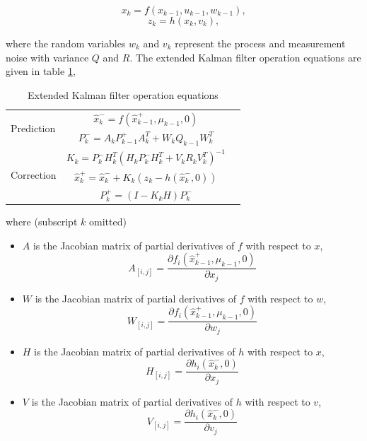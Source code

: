 \begin{equation}
x_k=f(x_{k-1}, u_{k-1}, w_{k-1}),
\end{equation}
\begin{equation}
z_k=h(x_k, v_k),
\end{equation}

\noindent where the random variables $w_k$ and $v_k$ represent the
process and measurement noise with variance $Q$ and $R$. The extended
Kalman filter operation equations are given in table \ref{tab:EKF},

\begin{table}[H]
\caption{Extended Kalman filter operation equations}
\label{tab:EKF}
\centering
\begin{tabular}{|l|c r|}
\hline
\multirow{2}{*}{Prediction} 
& $\hat{x}^-_k=f(\hat{x}^+_{k-1},\mu_{k-1},0)$ & \stepcounter{equation}\thetag{\theequation}\\
& $P^-_k = A_kP^+_{k-1}A_k^T+W_kQ_{k-1}W_k^T$ & \stepcounter{equation}\thetag{\theequation}\\
\hline
\multirow{3}{*}{Correction}
& $K_k=P^-_kH_k^T(H_kP^-_kH_k^T+V_kR_kV_k^T)^{-1}$  & \stepcounter{equation}\thetag{\theequation}\\
& $\hat{x}^+_k = \hat{x}^-_k+K_k(z_k-h(\hat{x}^-_k,0))$ & \stepcounter{equation}\thetag{\theequation}\\
& $P^+_k = (I-K_kH)P^-_k$ & \stepcounter{equation}\thetag{\theequation}\\
\hline
\end{tabular}
\end{table}
\FloatBarrier

\noindent where (subscript $k$ omitted)
\begin{itemize}
  \item $A$ is the Jacobian matrix of partial derivatives of $f$ with
  respect to $x$, $$A_{[i,j]}= \frac{\partial f_i(\hat{x}_{k-1}^+,
    \mu_{k-1}, 0)}{\partial x_j}$$
  \item $W$ is the Jacobian matrix of partial derivatives of $f$ with
  respect to $w$, $$W_{[i,j]}= \frac{\partial f_i(\hat{x}_{k-1}^+,
    \mu_{k-1}, 0)}{\partial w_j}$$
  \item $H$ is the Jacobian matrix of partial derivatives of $h$ with
  respect to $x$, $$H_{[i,j]}= \frac{\partial h_i(\hat{x}_k^-,
    0)}{\partial x_j}$$
  \item $V$ is the Jacobian matrix of partial derivatives of $h$ with
  respect to $v$, $$V_{[i,j]}= \frac{\partial
    h_i(\hat{x}_k^-,0)}{\partial v_j}$$
\end{itemize}

